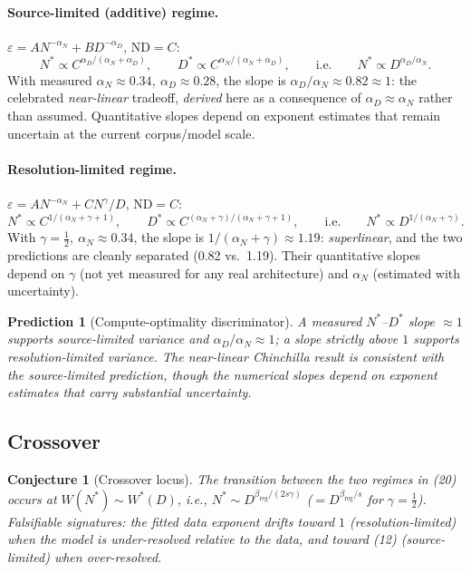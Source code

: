 \documentclass[12pt]{article}
\newcommand{\eps}{\varepsilon}
\newtheorem{conjecture}[theorem]{Conjecture}
\newtheorem{prediction}[theorem]{Prediction}
\theoremstyle{remark}
\begin{document}
\paragraph{Source-limited (additive) regime.}
$\eps=A N^{-\alpha_N}+B D^{-\alpha_D}$, $\text{ND}=C$:
\begin{equation}
  N^* \propto C^{\alpha_D/(\alpha_N+\alpha_D)},\qquad
  D^* \propto C^{\alpha_N/(\alpha_N+\alpha_D)},
  \qquad\text{i.e.}\qquad
  N^* \propto D^{\alpha_D/\alpha_N}.
  \label{eq:sourceopt}
\end{equation}
With measured $\alpha_N\approx0.34,\ \alpha_D\approx0.28$, the slope is
$\alpha_D/\alpha_N\approx0.82\approx1$: the celebrated \emph{near-linear}
tradeoff, \emph{derived} here as a consequence of $\alpha_D\approx\alpha_N$
rather than assumed. Quantitative slopes depend on exponent estimates
that remain uncertain at the current corpus/model scale.

\paragraph{Resolution-limited regime.}
$\eps=A N^{-\alpha_N}+C N^{\gamma}/D$, $\text{ND}=C$:
\begin{equation}
  N^* \propto C^{1/(\alpha_N+\gamma+1)},\qquad
  D^* \propto C^{(\alpha_N+\gamma)/(\alpha_N+\gamma+1)},
  \qquad\text{i.e.}\qquad
  N^* \propto D^{1/(\alpha_N+\gamma)}.
  \label{eq:resolopt}
\end{equation}
With $\gamma=\frac12,\ \alpha_N\approx0.34$, the slope is
$1/(\alpha_N+\gamma)\approx1.19$: \emph{superlinear}, and the two
predictions are cleanly separated (0.82 vs.\ 1.19). Their quantitative
slopes depend on $\gamma$ (not yet measured for any real architecture) and
$\alpha_N$ (estimated with uncertainty).

\begin{prediction}[Compute-optimality discriminator]
\label{pred:compute}
A measured $N^*$--$D^*$ slope $\approx1$ supports source-limited variance and
$\alpha_D/\alpha_N\approx1$; a slope strictly above $1$ supports
resolution-limited variance. The near-linear Chinchilla result is consistent
with the source-limited prediction, though the numerical slopes depend on
exponent estimates that carry substantial uncertainty.
\end{prediction}

\subsection{Crossover}
\begin{conjecture}[Crossover locus]
\label{conj:crossover}
The transition between the two regimes in (20) occurs at
$W(N^*)\sim W^*(D)$, i.e., $N^*\sim D^{\beta_{\mathrm{reg}}/(2s\gamma)}$
($=D^{\beta_{\mathrm{reg}}/s}$ for $\gamma=\frac12$). Falsifiable signatures: the
fitted data exponent drifts toward $1$ (resolution-limited) when the model is
under-resolved relative to the data, and toward (12)
(source-limited) when over-resolved.
\end{conjecture}
\end{document}

